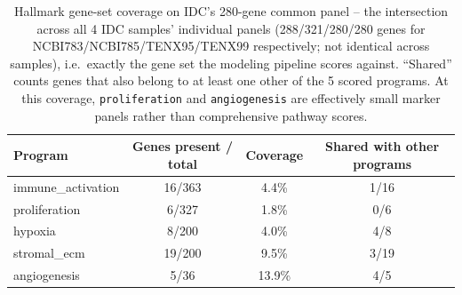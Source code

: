 \begin{table}[t]
\centering
\caption{Hallmark gene-set coverage on IDC's 280-gene common panel -- the intersection across all 4 IDC samples' individual panels (288/321/280/280 genes for NCBI783/NCBI785/TENX95/TENX99 respectively; not identical across samples), i.e.\ exactly the gene set the modeling pipeline scores against. ``Shared'' counts genes that also belong to at least one other of the 5 scored programs. At this coverage, \texttt{proliferation} and \texttt{angiogenesis} are effectively small marker panels rather than comprehensive pathway scores.}
\label{tab:hallmark_coverage}
\begin{tabular}{lccc}
\toprule
Program & Genes present / total & Coverage & Shared with other programs \\
\midrule
immune\_activation & 16/363 & 4.4\% & 1/16 \\
proliferation & 6/327 & 1.8\% & 0/6 \\
hypoxia & 8/200 & 4.0\% & 4/8 \\
stromal\_ecm & 19/200 & 9.5\% & 3/19 \\
angiogenesis & 5/36 & 13.9\% & 4/5 \\
\bottomrule
\end{tabular}
\end{table}
